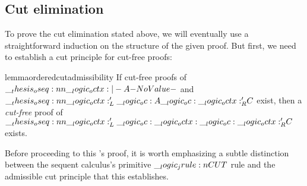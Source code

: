 








\subsection{Cut elimination}\label{sec:ordered-logic:cut-elimination}

To prove the cut elimination  stated above, we will eventually use a straightforward induction on the structure of the given proof.
But first, we need to establish a cut principle for cut-free proofs:
%
\begin{restatable*}[
  name=Admissibility of cut,
  label=lem:ordered-logic:cut-admissibility
]{lemma}{orderedcutadmissibility}
  If cut-free proofs of\/ $\oseq{\octx |- A}$ and $\oseq{\octx'_L \oc A \oc \octx'_R |- C}$ exist, then a \emph{cut-free} proof of\/ $\oseq{\octx'_L \oc \octx \oc \octx'_R |- C}$ exists.
\end{restatable*}

Before proceeding to this 's proof, it is worth emphasizing a subtle distinction between the sequent calculus's primitive $\__logic_jrule:n {CUT}$ rule and the admissible cut principle that this  establishes.

